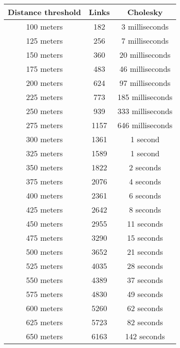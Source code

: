\begin{table}[H]
    \begin{tabular}{|c|c|c|}\hline
        Distance threshold & Links & Cholesky         \\\hline
        100 meters         & 182   & 3 milliseconds   \\\hline
        125 meters         & 256   & 7 milliseconds   \\\hline
        150 meters         & 360   & 20 milliseconds  \\\hline
        175 meters         & 483   & 46 milliseconds  \\\hline
        200 meters         & 624   & 97 milliseconds  \\\hline
        225 meters         & 773   & 185 milliseconds \\\hline
        250 meters         & 939   & 333 milliseconds \\\hline
        275 meters         & 1157  & 646 milliseconds \\\hline
        300 meters         & 1361  & 1 second         \\\hline
        325 meters         & 1589  & 1 second         \\\hline
        350 meters         & 1822  & 2 seconds        \\\hline
        375 meters         & 2076  & 4 seconds        \\\hline
        400 meters         & 2361  & 6 seconds        \\\hline
        425 meters         & 2642  & 8 seconds        \\\hline
        450 meters         & 2955  & 11 seconds       \\\hline
        475 meters         & 3290  & 15 seconds       \\\hline
        500 meters         & 3652  & 21 seconds       \\\hline
        525 meters         & 4035  & 28 seconds       \\\hline
        550 meters         & 4389  & 37 seconds       \\\hline
        575 meters         & 4830  & 49 seconds       \\\hline
        600 meters         & 5260  & 62 seconds       \\\hline
        625 meters         & 5723  & 82 seconds       \\\hline
        650 meters         & 6163  & 142 seconds      \\\hline

\end{tabular}
\end{table}
